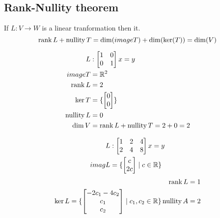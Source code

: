 \begin{example}
    \section{Rank-Nullity theorem}
If \(L : V \rightarrow W\) is a linear tranformation then it.
\begin{equation}
  \operatorname{rank} L + \operatorname{nullity} T = \dim (image T) + \dim(\ker(T)) = \dim(V)
\end{equation}
\begin{example}
   \begin{align*}
      L &: \begin{bmatrix}
          1 & 0 \\ 0 & 1
      \end{bmatrix} x = y\\
      image T  &= \mathbb{R}^2 \\ 
      \operatorname{rank} L &= 2 \\
      \ker T &= \{ \begin{bmatrix}
         0 \\ 0 
      \end{bmatrix} \} \\
      \operatorname{nullity} L &= 0\\
      \dim V &= \operatorname{rank} L + \operatorname{nullity} T = 2 +0 = 2
   \end{align*} 
\end{example}
\begin{example}
    \begin{align*}
    L &: \begin{bmatrix}
        1 & 2  & 4 \\ 2 & 4 & 8
    \end{bmatrix} x = y \\
    imag L &= \{
\begin{bmatrix}
   c \\ 2 c
\end{bmatrix}
     \mid c \in \mathbb{R} \}
    \end{align*}
    \begin{align*}
    \operatorname{rank} L = 1 \\
    \ker L = \{
        \begin{bmatrix}
           -2 c_1 - 4 c_2\\ c_1 \\  c_2
        \end{bmatrix}
            \mid  c_1, c_2 \in \mathbb{R} \}
    \operatorname{nullity} A = 2
    \end{align*}
\end{example}
\end{example}